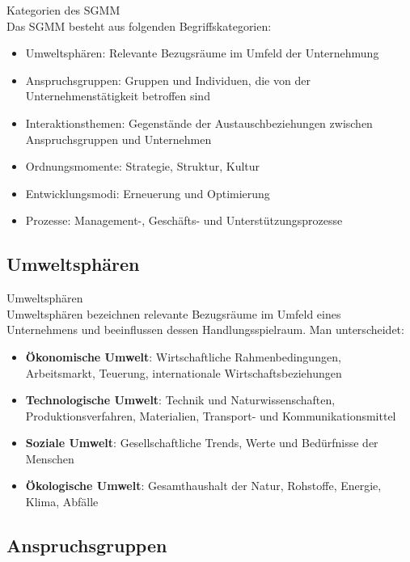 \begin{concept}{Kategorien des SGMM}\\
Das SGMM besteht aus folgenden Begriffskategorien:
\begin{itemize}
    \item Umweltsphären: Relevante Bezugsräume im Umfeld der Unternehmung
    \item Anspruchsgruppen: Gruppen und Individuen, die von der Unternehmenstätigkeit betroffen sind
    \item Interaktionsthemen: Gegenstände der Austauschbeziehungen zwischen Anspruchsgruppen und Unternehmen
    \item Ordnungsmomente: Strategie, Struktur, Kultur
    \item Entwicklungsmodi: Erneuerung und Optimierung
    \item Prozesse: Management-, Geschäfts- und Unterstützungsprozesse
\end{itemize}
\end{concept}

\subsection{Umweltsphären}

\begin{definition}{Umweltsphären}\\
Umweltsphären bezeichnen relevante Bezugsräume im Umfeld eines Unternehmens und beeinflussen dessen Handlungsspielraum. Man unterscheidet:
\begin{itemize}
    \item \textbf{Ökonomische Umwelt}: Wirtschaftliche Rahmenbedingungen, Arbeitsmarkt, Teuerung, internationale Wirtschaftsbeziehungen
    \item \textbf{Technologische Umwelt}: Technik und Naturwissenschaften, Produktionsverfahren, Materialien, Transport- und Kommunikationsmittel
    \item \textbf{Soziale Umwelt}: Gesellschaftliche Trends, Werte und Bedürfnisse der Menschen
    \item \textbf{Ökologische Umwelt}: Gesamthaushalt der Natur, Rohstoffe, Energie, Klima, Abfälle
\end{itemize}
\end{definition}

\subsection{Anspruchsgruppen}

